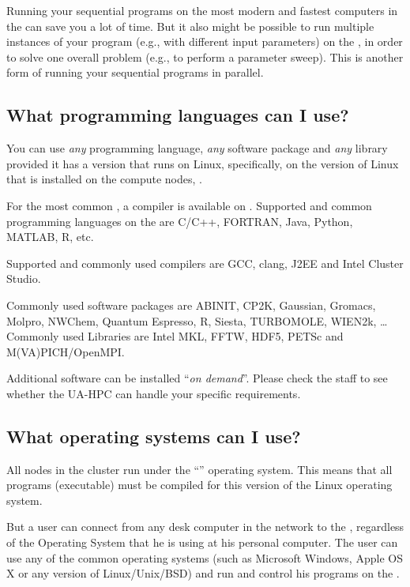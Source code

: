 Running your sequential programs on the most modern and fastest computers in
the \hpc can save you a lot of time.  But it also might be possible to run
multiple instances of your program (e.g., with different input parameters) on
the \hpc, in order to solve one overall problem (e.g., to perform a parameter
sweep). This is another form of running your sequential programs in parallel.

\subsection{What programming languages can I use?}
\label{sec:what-programming-languages-can-i-use}

You can use \emph{any} programming language, \emph{any} software package and
\emph{any} library provided it has a version that runs on Linux, specifically,
on the version of Linux that is installed on the compute nodes, \operatingsystem.

For the most common , a compiler is available on
\operatingsystem. Supported and common programming languages on the \hpc are
C/C++, FORTRAN, Java, Python, MATLAB, R, etc.

\ifantwerpen
Supported and commonly used compilers are GCC, clang, J2EE and Intel Cluster
Studio.

Commonly used software packages are ABINIT, CP2K, Gaussian, Gromacs, Molpro,
NWChem, Quantum Espresso, R, Siesta, TURBOMOLE, WIEN2k, \ldots
Commonly used Libraries are Intel MKL, FFTW, HDF5, PETSc and M(VA)PICH/OpenMPI.
\fi

Additional software can be installed ``\emph{on demand}''. Please check the
\hpc staff to see whether the UA-HPC can handle your specific requirements.

\subsection{What operating systems can I use?}
\label{sec:what-operating-systems-can-i-use}

All nodes in the \hpc cluster run under the ``\operatingsystem'' 
operating system. This means that all programs (executable) must be compiled for this version
of the Linux operating system.

But a user can connect from any desk computer in the \university network to the \hpc,
regardless of the Operating System that he is using at his personal computer.
The user can use any of the common operating systems (such as Microsoft Windows, Apple OS X or
any version of Linux/Unix/BSD) and run and control his programs on the \hpc.

